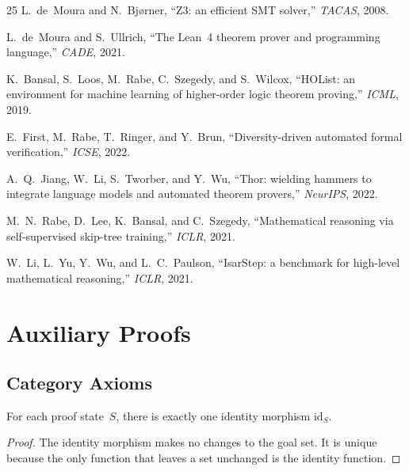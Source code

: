 \documentclass[11pt]{article}
\begin{document}
\begin{thebibliography}{25}
L.~de~Moura and N.~Bj{\o}rner,
``Z3: an efficient SMT solver,''
\emph{TACAS}, 2008.

L.~de~Moura and S.~Ullrich,
``The Lean~4 theorem prover and programming language,''
\emph{CADE}, 2021.

K.~Bansal, S.~Loos, M.~Rabe, C.~Szegedy, and S.~Wilcox,
``HOList: an environment for machine learning of higher-order
logic theorem proving,''
\emph{ICML}, 2019.

E.~First, M.~Rabe, T.~Ringer, and Y.~Brun,
``Diversity-driven automated formal verification,''
\emph{ICSE}, 2022.

A.~Q.~Jiang, W.~Li, S.~Tworber, and Y.~Wu,
``Thor: wielding hammers to integrate language models and
automated theorem provers,''
\emph{NeurIPS}, 2022.

M.~N.~Rabe, D.~Lee, K.~Bansal, and C.~Szegedy,
``Mathematical reasoning via self-supervised skip-tree
training,''
\emph{ICLR}, 2021.

W.~Li, L.~Yu, Y.~Wu, and L.~C.~Paulson,
``IsarStep: a benchmark for high-level mathematical
reasoning,''
\emph{ICLR}, 2021.

\end{thebibliography}

\appendix

\section{Auxiliary Proofs}\label{app:proofs}

\subsection{Category Axioms}

\begin{lemma}%
\label{lem:idunique}
For each proof state~$S$, there is exactly one identity
morphism $\mathrm{id}_S$.
\end{lemma}
\begin{proof}
The identity morphism makes no changes to the goal set.
It is unique because the only function that leaves a set
unchanged is the identity function.
\end{proof}
\end{document}

